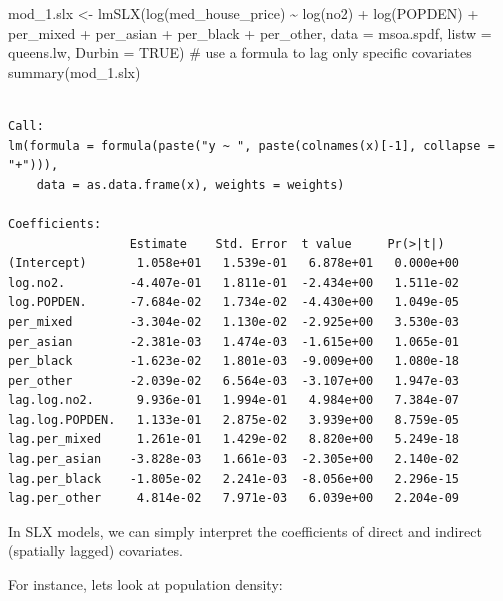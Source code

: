 \documentclass[
  letterpaper,
]{scrbook}
\newenvironment{Shaded}{\begin{snugshade}}{\end{snugshade}}
\newcommand{\AttributeTok}[1]{\textcolor[rgb]{0.40,0.45,0.13}{#1}}
\newcommand{\CommentTok}[1]{\textcolor[rgb]{0.37,0.37,0.37}{#1}}
\newcommand{\ConstantTok}[1]{\textcolor[rgb]{0.56,0.35,0.01}{#1}}
\newcommand{\FunctionTok}[1]{\textcolor[rgb]{0.28,0.35,0.67}{#1}}
\newcommand{\NormalTok}[1]{\textcolor[rgb]{0.00,0.23,0.31}{#1}}
\newcommand{\OtherTok}[1]{\textcolor[rgb]{0.00,0.23,0.31}{#1}}
\newcommand{\SpecialCharTok}[1]{\textcolor[rgb]{0.37,0.37,0.37}{#1}}
\begin{document}
\begin{Shaded}
\begin{Highlighting}[]
\NormalTok{mod\_1.slx }\OtherTok{\textless{}{-}} \FunctionTok{lmSLX}\NormalTok{(}\FunctionTok{log}\NormalTok{(med\_house\_price) }\SpecialCharTok{\textasciitilde{}} \FunctionTok{log}\NormalTok{(no2) }\SpecialCharTok{+} \FunctionTok{log}\NormalTok{(POPDEN) }\SpecialCharTok{+} 
\NormalTok{                     per\_mixed }\SpecialCharTok{+}\NormalTok{ per\_asian }\SpecialCharTok{+}\NormalTok{ per\_black }\SpecialCharTok{+}\NormalTok{ per\_other,  }
                   \AttributeTok{data =}\NormalTok{ msoa.spdf, }
                   \AttributeTok{listw =}\NormalTok{ queens.lw, }
                   \AttributeTok{Durbin =} \ConstantTok{TRUE}\NormalTok{) }\CommentTok{\# use a formula to lag only specific covariates}
\FunctionTok{summary}\NormalTok{(mod\_1.slx)}
\end{Highlighting}
\end{Shaded}

\begin{verbatim}

Call:
lm(formula = formula(paste("y ~ ", paste(colnames(x)[-1], collapse = "+"))), 
    data = as.data.frame(x), weights = weights)

Coefficients:
                 Estimate    Std. Error  t value     Pr(>|t|)  
(Intercept)       1.058e+01   1.539e-01   6.878e+01   0.000e+00
log.no2.         -4.407e-01   1.811e-01  -2.434e+00   1.511e-02
log.POPDEN.      -7.684e-02   1.734e-02  -4.430e+00   1.049e-05
per_mixed        -3.304e-02   1.130e-02  -2.925e+00   3.530e-03
per_asian        -2.381e-03   1.474e-03  -1.615e+00   1.065e-01
per_black        -1.623e-02   1.801e-03  -9.009e+00   1.080e-18
per_other        -2.039e-02   6.564e-03  -3.107e+00   1.947e-03
lag.log.no2.      9.936e-01   1.994e-01   4.984e+00   7.384e-07
lag.log.POPDEN.   1.133e-01   2.875e-02   3.939e+00   8.759e-05
lag.per_mixed     1.261e-01   1.429e-02   8.820e+00   5.249e-18
lag.per_asian    -3.828e-03   1.661e-03  -2.305e+00   2.140e-02
lag.per_black    -1.805e-02   2.241e-03  -8.056e+00   2.296e-15
lag.per_other     4.814e-02   7.971e-03   6.039e+00   2.204e-09
\end{verbatim}

In SLX models, we can simply interpret the coefficients of direct and
indirect (spatially lagged) covariates.

For instance, lets look at population density:
\end{document}
